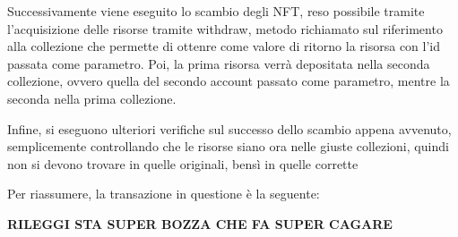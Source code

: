 
Successivamente viene eseguito lo scambio degli NFT, reso possibile tramite l'acquisizione delle risorse tramite withdraw, metodo richiamato sul riferimento alla collezione che permette di ottenre come valore di ritorno la risorsa con l'id passata come parametro. Poi, la prima risorsa verrà depositata nella seconda collezione, ovvero quella del secondo account passato come parametro, mentre la seconda nella prima collezione.


Infine, si eseguono ulteriori verifiche sul successo dello scambio appena avvenuto, semplicemente controllando che le risorse siano ora nelle giuste collezioni, quindi non si devono trovare in quelle originali, bensì in quelle corrette


Per riassumere, la transazione in questione è la seguente:


\textbf{RILEGGI STA SUPER BOZZA CHE FA SUPER CAGARE}